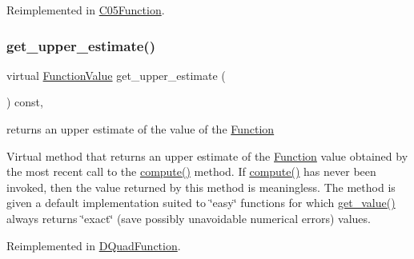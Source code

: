 Reimplemented in \mbox{\hyperlink{class_s_m_spp__di__unipi__it_1_1_c05_function_a3ad74d9506761eb2ca4c8a936fb7a1c5}{C05\+Function}}.

\mbox{\label{class_s_m_spp__di__unipi__it_1_1_function_a018379619bc05b38bdab0e225016f98f}} 
\subsubsection{\texorpdfstring{get\+\_\+upper\+\_\+estimate()}{get\_upper\_estimate()}}
{\footnotesize\ttfamily virtual \mbox{\hyperlink{class_s_m_spp__di__unipi__it_1_1_function_a9ad432406b609e28d340f73e9474bffe}{Function\+Value}} get\+\_\+upper\+\_\+estimate (\begin{DoxyParamCaption}\item[{void}]{ }\end{DoxyParamCaption}) const\hspace{0.3cm}{\ttfamily [inline]}, {\ttfamily [virtual]}}



returns an upper estimate of the value of the \mbox{\hyperlink{class_s_m_spp__di__unipi__it_1_1_function}{Function}} 

Virtual method that returns an upper estimate of the \mbox{\hyperlink{class_s_m_spp__di__unipi__it_1_1_function}{Function}} value obtained by the most recent call to the \mbox{\hyperlink{class_s_m_spp__di__unipi__it_1_1_function_a504d4e3e174c7a518cc66156a8a45ce5}{compute()}} method. If \mbox{\hyperlink{class_s_m_spp__di__unipi__it_1_1_function_a504d4e3e174c7a518cc66156a8a45ce5}{compute()}} has never been invoked, then the value returned by this method is meaningless. The method is given a default implementation suited to \char`\"{}easy\char`\"{} functions for which \mbox{\hyperlink{class_s_m_spp__di__unipi__it_1_1_function_a040b4850ae0a23a1c9ff79b497b6eaaf}{get\+\_\+value()}} always returns \char`\"{}exact\char`\"{} (save possibly unavoidable numerical errors) values. 

Reimplemented in \mbox{\hyperlink{class_s_m_spp__di__unipi__it_1_1_d_quad_function_ae2ab9abc3617f25a7c526c457362864f}{D\+Quad\+Function}}.

